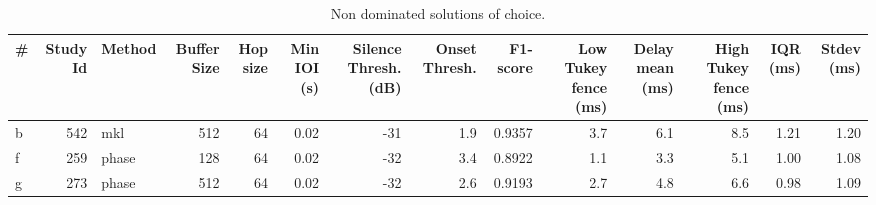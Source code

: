 \begin{table}
\centering
\caption{Non dominated solutions of choice.}
\label{tb:sol}
\begin{tabular}{lrlrrrrrrrrrrr}
\toprule
 \# &  Study Id & Method &  Buffer Size &  Hop size &  Min IOI (s) &  Silence Thresh. (dB) &  Onset Thresh. &  F1-score &  Low Tukey fence (ms) &  Delay mean (ms) &  High Tukey fence (ms) &  IQR (ms) &  Stdev (ms) \\
\midrule
 b &       542 &    mkl &          512 &        64 &         0.02 &                   -31 &            1.9 &    0.9357 &                   3.7 &              6.1 &                    8.5 &      1.21 &        1.20 \\
 f &       259 &  phase &          128 &        64 &         0.02 &                   -32 &            3.4 &    0.8922 &                   1.1 &              3.3 &                    5.1 &      1.00 &        1.08 \\
 g &       273 &  phase &          512 &        64 &         0.02 &                   -32 &            2.6 &    0.9193 &                   2.7 &              4.8 &                    6.6 &      0.98 &        1.09 \\
\bottomrule
\end{tabular}
\end{table}
